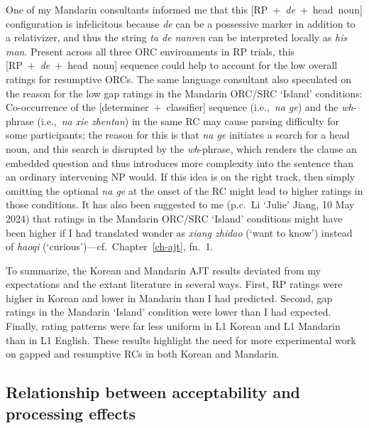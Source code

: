 \noindent One of my Mandarin consultants informed me that this [RP~+~\textit{de}~+~head~noun] configuration is infelicitous because \textit{de} can be a possessive marker in addition to a relativizer, and thus the string \textit{ta de nanren} can be interpreted locally as \textit{his man}. Present across all three ORC environments in RP trials, this [RP~+~\textit{de}~+~head~noun] sequence could help to account for the low overall ratings for resumptive ORCs. The same language consultant also speculated on the reason for the low gap ratings in the Mandarin ORC/SRC `Island' conditions: Co-occurrence of the [determiner~+~classifier] sequence (i.e.,~\textit{na ge}) and the \textit{wh}-phrase (i.e.,~\textit{na xie zhentan}) in the same RC may cause parsing difficulty for some participants; the reason for this is that \textit{na ge} initiates a search for a head noun, and this search is disrupted by the \textit{wh}-phrase, which renders the clause an embedded question and thus introduces more complexity into the sentence than an ordinary intervening NP would. If this idea is on the right track, then simply omitting the optional \textit{na ge} at the onset of the RC might lead to higher ratings in those conditions.\footnotemark{} It has also been suggested to me (p.c.~Li `Julie' Jiang, 10 May 2024) that ratings in the Mandarin ORC/SRC `Island' conditions might have been higher if I had translated wonder as \textit{xiang zhidao} (`want to know') instead of \textit{haoqi} (`curious')---cf.~Chapter~\ref{ch-ajt}, fn.~1.


To summarize, the Korean and Mandarin AJT results deviated from my expectations and the extant literature in several ways. First, RP ratings were higher in Korean and lower in Mandarin than I had predicted. Second, gap ratings in the Mandarin `Island' condition were lower than I had expected. Finally, rating patterns were far less uniform in L1 Korean and L1 Mandarin than in L1 English. These results highlight the need for more experimental work on gapped and resumptive RCs in both Korean and Mandarin.

\subsection{Relationship between acceptability and processing effects}\label{dis-assumption}

